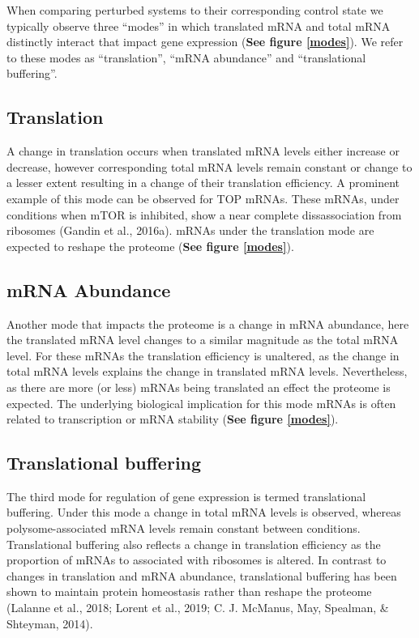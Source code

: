 \documentclass[12pt,openany]{book}
\begin{document}
When comparing perturbed systems to their corresponding control state we
typically observe three ``modes'' in which translated mRNA and total
mRNA distinctly interact that impact gene expression (\textbf{See figure
\ref{modes}}). We refer to these modes as ``translation'', ``mRNA
abundance'' and ``translational buffering''.

\subsection{Translation}

A change in translation occurs when translated mRNA levels either
increase or decrease, however corresponding total mRNA levels remain
constant or change to a lesser extent resulting in a change of their
translation efficiency. A prominent example of this mode can be observed
for TOP mRNAs. These mRNAs, under conditions when mTOR is inhibited,
show a near complete dissassociation from ribosomes (Gandin et al.,
2016a). mRNAs under the translation mode are expected to reshape the
proteome (\textbf{See figure \ref{modes}}).

\subsection{mRNA Abundance}

Another mode that impacts the proteome is a change in mRNA abundance,
here the translated mRNA level changes to a similar magnitude as the
total mRNA level. For these mRNAs the translation efficiency is
unaltered, as the change in total mRNA levels explains the change in
translated mRNA levels. Nevertheless, as there are more (or less) mRNAs
being translated an effect the proteome is expected. The underlying
biological implication for this mode mRNAs is often related to
transcription or mRNA stability (\textbf{See figure \ref{modes}}).

\subsection{Translational buffering} \label{modeBuffering}

The third mode for regulation of gene expression is termed translational
buffering. Under this mode a change in total mRNA levels is observed,
whereas polysome-associated mRNA levels remain constant between
conditions. Translational buffering also reflects a change in
translation efficiency as the proportion of mRNAs to associated with
ribosomes is altered. In contrast to changes in translation and mRNA
abundance, translational buffering has been shown to maintain protein
homeostasis rather than reshape the proteome (Lalanne et al., 2018;
Lorent et al., 2019; C. J. McManus, May, Spealman, \& Shteyman, 2014).
\end{document}
